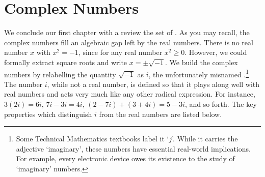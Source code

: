\section{Complex Numbers}
\label{CmpNums}

We conclude our first chapter with a review the set of .  As you may recall, the complex numbers fill an algebraic gap left by the real numbers.  There is no real number $x$ with $x^2 = -1$, since for any real number $x^2 \geq 0$.  However, we could formally extract square roots and write $x = \pm \sqrt{-1}$.  We build the complex numbers by relabelling the quantity $\sqrt{-1}$ as $i$, the unfortunately misnamed .\footnote{Some Technical Mathematics textbooks label it `$j$'.  While it carries the adjective `imaginary', these numbers have essential real-world implications.  For example, every electronic device owes its existence to the study of `imaginary' numbers.}  The number $i$, while not a real number, is defined so that it plays along well with real numbers and acts very much like any other radical expression.  For instance, $3(2i) = 6i$, $7i-3i = 4i$, $(2-7i) + (3 + 4i) = 5-3i$, and so forth.  The key properties which distinguish $i$ from the real numbers are listed below.


\medskip


